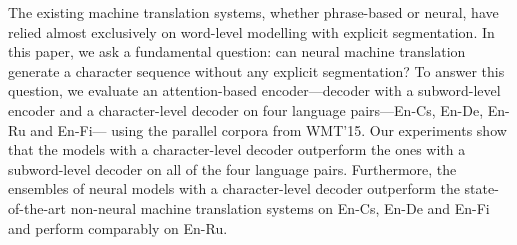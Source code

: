 The existing machine translation systems, whether phrase-based or neural, have relied almost exclusively on word-level modelling with explicit segmentation. In this paper, we ask a fundamental question: can neural machine translation generate a character sequence without any explicit segmentation? To answer this question, we evaluate an attention-based encoder---decoder with a subword-level encoder and a character-level decoder on four language pairs---En-Cs, En-De, En-Ru and En-Fi--- using the parallel corpora from WMT'15. Our experiments show that the models with a character-level decoder outperform the ones with a subword-level decoder on all of the four language pairs. Furthermore, the ensembles of neural models with a character-level decoder outperform the state-of-the-art non-neural machine translation systems on En-Cs, En-De and En-Fi and perform comparably on En-Ru.
